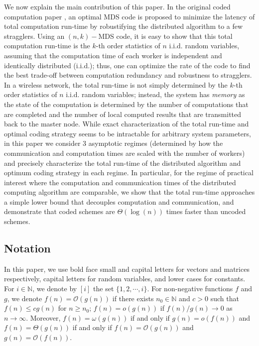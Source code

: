 \documentclass[onecolumn,journal,twoside]{IEEEtran}
\begin{document}
We now explain the main contribution of this paper. In the original coded computation paper \cite{lee2016speeding}, an optimal MDS code is proposed to minimize the latency of total computation run-time by robustifying the distributed algorithm to a few stragglers. Using an $(n,k)-$MDS code, it is easy to show that this total computation run-time is the $k$-th order statistics of $n$ i.i.d. random variables, assuming that the computation time of each worker is independent and identically distributed (i.i.d.); thus, one can optimize the rate of the code to find the best trade-off between computation redundancy and robustness to stragglers. In a wireless network, the total run-time is not simply determined by the $k$-th order statistics of $n$ i.i.d. random variables; instead, the system has \emph{memory} as the state of the computation is determined by the number of computations that are completed and the number of local computed results that are transmitted back to the master node. While exact characterization of the total run-time and optimal coding strategy seems to be intractable for arbitrary system parameters, in this paper we consider 3 asymptotic regimes (determined by how the communication and computation times are scaled with the number of workers) and precisely characterize the total run-time of the distributed algorithm and optimum coding strategy in each regime. In particular, for the regime of practical interest where the computation and communication times of the distributed computing algorithm are comparable, we show that the total run-time approaches a simple lower bound that decouples computation and communication, and demonstrate that coded schemes are $\Theta(\log(n))$ times faster than uncoded schemes. 

\subsection{Notation}

In this paper, we use bold face small and capital letters for vectors and matrices respectively, capital letters for random variables, and lower cases for constants. For $i\in \mathbb{N}$, we denote by $[i]$ the set $\{1,2,\cdots,i\}$. For non-negative functions $f$ and $g$, we denote $f(n)=\mathcal{O}(g(n))$ if there exists $n_0\in \mathbb{N}$ and $c>0$ such that $f(n) \leq c g(n)$ for $n\geq n_0$; $f(n)=o(g(n))$ if $f(n)/g(n) \rightarrow 0$ as $n \to \infty$. Moreover, $f(n)=\omega(g(n))$ if and only if $g(n)=o(f(n))$ and $f(n)=\Theta(g(n))$ if and only if $f(n)=\mathcal{O}(g(n))$ and $g(n)=\mathcal{O}(f(n))$.
\end{document}
